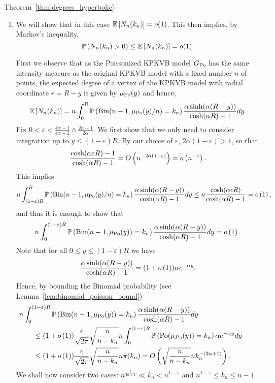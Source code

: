 \begin{proofof}{Theorem~\ref{thm:degrees_hyperbolic}}
\begin{enumerate}[\upshape (i)]
Finally, since $k_n = \bigO{n^{\frac{1}{2\alpha+1}}}$, by Lemma~\ref{lem:diff_Nk_hyperbolic_binomial_poisson}, $\Exp{| N_n(k_n) - N_{Po}(k_n)|} = o(\Exp{N_{Po}(k_n)}) = o(\zeta)$, from which it follows that $\Prob{|N_n(k_n)-N_{Po}(k_n)|\geq 1} \leq \Exp{ |N_n(k_n)-N_{Po}(k_n)|} = o(\zeta)$. Hence, it also holds in the original KPKVB model that $N_n(k_n) \xrightarrow{d} Po(\zeta)$.

\item We will show that in this case $\mathbb{E}\left[N_n(k_n)\right] = o(1)$. This then implies, by Markov's inequality,
\[
	\mathbb{P}\left(N_n(k_n)>0\right)\leq \mathbb{E}\left[N_n(k_n)\right] = o(1).
\]

First we observe that as the Poissonized KPKVB model $G_{{\mathrm{Po}}}$ has the same intensity measure as the original KPKVB model with a fixed number $n$ of points, the expected degree of a vertex of the KPKVB model with radial coordinate $r=R-y$ is given by $\mu_{{\mathrm{Po}}}(y)$ and hence,
\[
	\mathbb{E}\left[N_n(k_n)\right] = n \int_0^R \mathbb{P}\left(\mathrm{Bin}(n-1,\mu_{{\mathrm{Po}}}(y)/n) = k_n\right) 
	\frac{\alpha \sinh(\alpha (R-y))}{\cosh(\alpha R)-1} dy.
\]
Fix $0 < \varepsilon < \frac{4\alpha - 1}{4\alpha + 2} \wedge \frac{2\alpha - 1}{2\alpha}$. We first show that we only need to consider integration up to $y \le (1-\varepsilon)R$. By our choice of $\varepsilon$, $2\alpha(1-\varepsilon) > 1$, so that
\[
	\frac{\cosh(\alpha \varepsilon R) - 1}{\cosh(\alpha R) - 1}
	= O\left(n^{-2\alpha (1 - \varepsilon)}\right) = o\left(n^{-1}\right).
\]
This implies
\[
	n \int_{(1-\varepsilon)R}^R \mathbb{P}\left(\mathrm{Bin}(n-1,\mu_{{\mathrm{Po}}}(y)/n) = k_n\right)
	\frac{\alpha \sinh(\alpha (R-y))}{\cosh(\alpha R)-1} dy
	\le n \frac{\cosh(\alpha \epsilon R)}{\cosh(\alpha R)-1} = o\left(1\right),
\]
and thus it is enough to show that
\[
	n \int_0^{(1-\varepsilon)R} \mathbb{P}\left(\mathrm{Bin}(n-1,\mu_{{\mathrm{Po}}}(y)) = k_n\right)
	\frac{\alpha \sinh(\alpha (R-y))}{\cosh(\alpha R)-1} dy = o\left(1\right).
\]
Note that for all $0 \le y \le (1-\varepsilon)R$ we have
\[
	\frac{\alpha \sinh(\alpha (R-y))}{\cosh(\alpha R)-1} = (1+o\left(1\right)) \alpha e^{-\alpha y}.
\]
Hence, by bounding the Binomial probability (see Lemma~\ref{lem:binomial_poisson_bound})
\begin{align*}
	&\hspace{-20pt} n \int_0^{(1-\varepsilon)R} \Prob{\mathrm{Bin}(n-1,\mu_{\Po}(y)) = k_n}
		\frac{\alpha \sinh(\alpha (R-y))}{\cosh(\alpha R)-1} dy\\
	&\le (1+\smallO{1}) \frac{e}{\sqrt{2\pi}} \sqrt{\frac{n}{n-k_n}}
		n \int_0^{(1-\varepsilon)R} \Prob{\Po(\mu_{Po}(y)) = k_n} \alpha e^{-\alpha y} dy \\
	&\le (1+\smallO{1}) \frac{e}{\sqrt{2\pi}} \sqrt{\frac{n}{n-k_n}} n \pmf(k_n)
	= \bigO{\sqrt{\frac{n}{n-k_n}} n k_n^{-(2\alpha + 1)}}.
\end{align*}
We shall now consider two cases: $n^{\frac{1}{2\alpha + 1}} \ll k_n < n^{1-\varepsilon}$ and $n^{1-\varepsilon} \le k_n \le n - 1$.


\end{enumerate}
\end{proofof}
